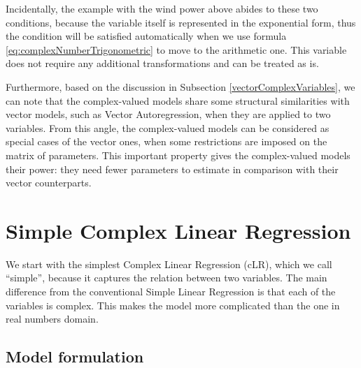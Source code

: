 \documentclass[
]{book}
\begin{document}
Incidentally, the example with the wind power above abides to these two conditions, because the variable itself is represented in the exponential form, thus the condition will be satisfied automatically when we use formula \eqref{eq:complexNumberTrigonometric} to move to the arithmetic one. This variable does not require any additional transformations and can be treated as is.

Furthermore, based on the discussion in Subsection \ref{vectorComplexVariables}, we can note that the complex-valued models share some structural similarities with vector models, such as Vector Autoregression, when they are applied to two variables. From this angle, the complex-valued models can be considered as special cases of the vector ones, when some restrictions are imposed on the matrix of parameters. This important property gives the complex-valued models their power: they need fewer parameters to estimate in comparison with their vector counterparts.

\hypertarget{simpleCLR}{%
\chapter{Simple Complex Linear Regression}\label{simpleCLR}}

We start with the simplest Complex Linear Regression (cLR), which we call ``simple'', because it captures the relation between two variables. The main difference from the conventional Simple Linear Regression is that each of the variables is complex. This makes the model more complicated than the one in real numbers domain.

\hypertarget{simpleCLRModel}{%
\section{Model formulation}\label{simpleCLRModel}}
\end{document}
